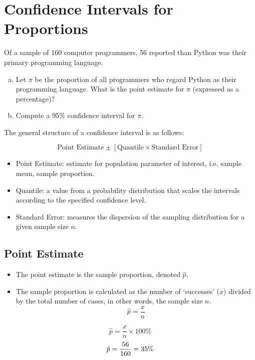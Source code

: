 \documentclass[a4paper,12pt]{article}
\begin{document}
\section*{Confidence Intervals for Proportions}
Of a sample of 160 computer programmers, 56 reported than Python was their primary programming language.
\begin{enumerate}[(a)]
	\item Let $\pi$ be the proportion of all programmers who regard Python as their programming language. What is the point estimate for $\pi$ (expressed as a percentage)?
	\item Compute a $95\%$ confidence interval for $\pi$.
\end{enumerate}


\begin{framed}
The general structure of a confidence interval is as follows:

\[ \mbox{Point Estimate}  \pm \left[ \mbox{Quantile} \times \mbox{Standard Error} \right] \]


\begin{itemize}
\item Point Estimate: estimate for population parameter of interest, i.e. sample mean, sample proportion.
\item Quantile: a value from a probability distribution that scales the intervals according to the specified confidence level.
\item Standard Error: measures the dispersion of the sampling distribution for a given sample size $n$.
\end{itemize}
\end{framed}

\subsection*{Point Estimate}
\begin{itemize}
\item The point estimate is the sample proportion, denoted $\hat{p}$.  
\item The sample proportion is calculated as the number of `successes' ($x$) divided by the total number of cases, in other words, the sample size $n$.
\[  \hat{p} = \frac{x}{n}  \]
\end{itemize}

\[
\hat{p} = \frac{x}{n} \times 100\% 
\]
\[
\hat{p} = {56 \over 160} = 35\%
\]
\end{document}
